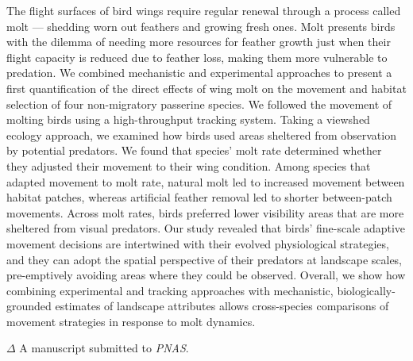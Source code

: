 \small{
    The flight surfaces of bird wings require regular renewal through a process called molt --- shedding worn out feathers and growing fresh ones.
    Molt presents birds with the dilemma of needing more resources for feather growth just when their flight capacity is reduced due to feather loss, making them more vulnerable to predation.
    We combined mechanistic and experimental approaches to present a first quantification of the direct effects of wing molt on the movement and habitat selection of four non-migratory passerine species. 
    We followed the movement of molting birds using a high-throughput tracking system. 
    Taking a viewshed ecology approach, we examined how birds used areas sheltered from observation by potential predators.
    We found that species' molt rate determined whether they adjusted their movement to their wing condition.
    Among species that adapted movement to molt rate, natural molt led to increased movement between habitat patches, whereas artificial feather removal led to shorter between-patch movements. 
    Across molt rates, birds preferred lower visibility areas that are more sheltered from visual predators.
    Our study revealed that birds’ fine-scale adaptive movement decisions are intertwined with their evolved physiological strategies, and they can adopt the spatial perspective of their predators at landscape scales, pre-emptively avoiding areas where they could be observed.
    Overall, we show how combining experimental and tracking approaches with mechanistic, biologically-grounded estimates of landscape attributes allows cross-species comparisons of movement strategies in response to molt dynamics.

    \bigskip

    {\noindent \large{$\Delta$}} \normalfont A manuscript submitted to \textit{PNAS}.

}

\clearpage
